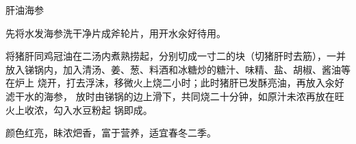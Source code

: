 \begin{recipe}{肝油海参}

\ingredients


\preparation

\step 先将水发海参洗干净片成斧轮片，用开水汆好待用。

\step 将猪肝同鸡冠油在二汤内煮熟捞起，分别切成一寸二的块（切猪肝时去筋），一并
放入锑锅内，加入清汤、姜、葱、料酒和冰糖炒的糖汁、味精、盐、胡椒、酱油等在炉上
烧开，打去浮沫，移微火上烧二小时；此时猪肝已发酥亮油，再放入汆好滤干水的海参，
放时由锑锅的边上滑下，共同烧二十分钟，如原汁未浓再放在旺火上收浓，勾入水豆粉起
锅即成。

\features

颜色红亮，眛浓𤆵香，富于营养，适宜春冬二季。

\end{recipe}

